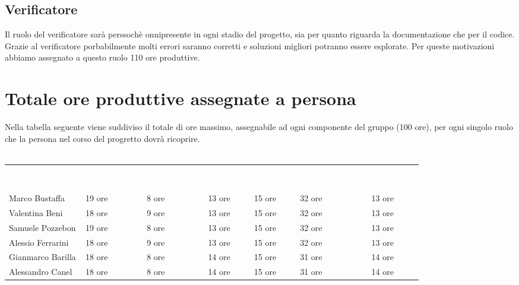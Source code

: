 \subsection{Verificatore}
Il ruolo del verificatore sarà perssochè onnipresente in ogni stadio del progetto, sia per quanto riguarda la documentazione che per il codice. Grazie al verificatore porbabilmente molti errori saranno corretti
e soluzioni migliori potranno essere esplorate. Per queste motivazioni abbiamo assegnato a questo ruolo 110 ore produttive.

\section{Totale ore produttive assegnate a persona}
Nella tabella seguente viene suddiviso il totale di ore massimo, assegnabile ad ogni componente del gruppo
(100 ore), per ogni singolo ruolo che la persona nel corso del progretto dovrà ricoprire.\\\\
{\renewcommand{\arraystretch}{1.5}
\scriptsize
\begin{tabular}{p{0.15\linewidth}p{0.12\linewidth}p{0.12\linewidth}p{0.09\linewidth}p{0.09\linewidth}p{0.14\linewidth}p{0.10\linewidth}}
	\rowcolor[RGB]{33, 73, 50}
	\textcolor{white}{\textbf{Componente}} & \textcolor{white}{\textbf{Responsabile}} & \textcolor{white}
	{\textbf{Amministratore}} & \textcolor{white}{\textbf{Analista}} & \textcolor{white}
	{\textbf{Progettista}} & \textcolor{white}{\textbf{Programmatore}} & \textcolor{white}{\textbf{Verificatore}}\\
	\rowcolor[RGB]{216, 235, 171}
	Marco Bustaffa & 19 ore & 8 ore & 13 ore & 15 ore & 32 ore & 13 ore        	\\
	\rowcolor[RGB]{233, 245, 206}
	Valentina Beni & 18 ore & 9 ore & 13 ore & 15 ore & 32 ore & 13 ore        	\\
	\rowcolor[RGB]{216, 235, 171}
	Samuele Pozzebon & 19 ore & 8 ore & 13 ore & 15 ore & 32 ore & 13 ore      	\\
    \rowcolor[RGB]{233, 245, 206}
	Alessio Ferrarini & 18 ore & 9 ore & 13 ore & 15 ore & 32 ore & 13 ore     	\\
    \rowcolor[RGB]{216, 235, 171}
	Gianmarco Barilla & 18 ore & 8 ore & 14 ore & 15 ore & 31 ore & 14 ore     	\\
    \rowcolor[RGB]{233, 245, 206}
	Alessandro Canel & 18 ore & 8 ore & 14 ore & 15 ore & 31 ore & 14 ore    	\\
\end{tabular}	
}